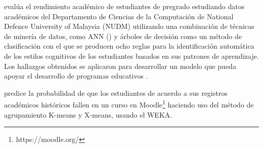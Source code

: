 \textcite{chen2008integrated} evalúa el rendimiento académico de estudiantes de pregrado estudiando datos académicos del Departamento de Ciencias de la Computación de National Defence University of Malaysia (NUDM) utilizando una combinación de técnicas de minería de datos, como ANN () y árboles de decisión como un método de clasificación con el que se producen ocho reglas para la identificación automática de los estilos cognitivos de los estudiantes basados en sus patrones de aprendizaje. Los hallazgos obtenidos se aplicaron para desarrollar un modelo que pueda apoyar el desarrollo de programas educativos .

\textcite{moreno2009data} predice la probabilidad de que los estudiantes de acuerdo a sus registros académicos históricos fallen en un curso  en Moodle\footnote{https://moodle.org/} haciendo uso del método de agrupamiento K-means y X-means, usando el  WEKA.





